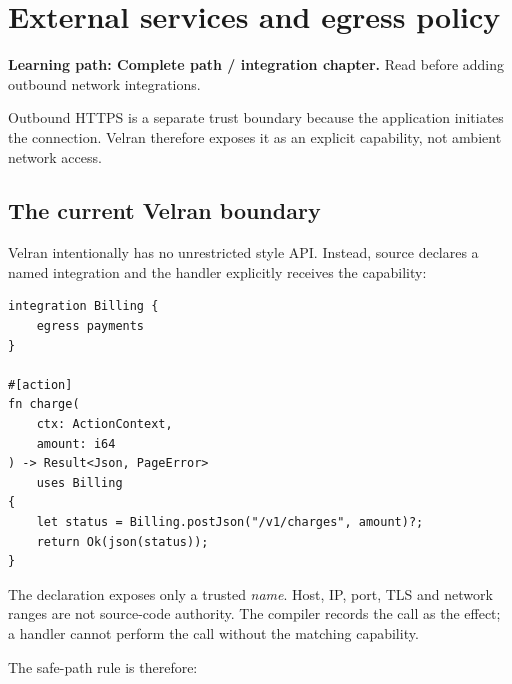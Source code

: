 \chapter{External services and egress policy}

\noindent\textbf{Learning path: Complete path / integration chapter.} Read before adding outbound network integrations.\par\medskip



Outbound HTTPS is a separate trust boundary because the application initiates the connection. Velran therefore exposes it as an explicit capability, not ambient network access.

\section{The current Velran boundary}

Velran intentionally has no unrestricted  style API. Instead, source declares a named integration and the handler explicitly receives the capability:

\begin{lstlisting}[language=Velran]
integration Billing {
    egress payments
}

#[action]
fn charge(
    ctx: ActionContext,
    amount: i64
) -> Result<Json, PageError>
    uses Billing
{
    let status = Billing.postJson("/v1/charges", amount)?;
    return Ok(json(status));
}
\end{lstlisting}

The declaration exposes only a trusted \emph{name}. Host, IP, port, TLS and network ranges are not source-code authority. The compiler records the call as the  effect; a handler cannot perform the call without the matching  capability.

The safe-path rule is therefore:

